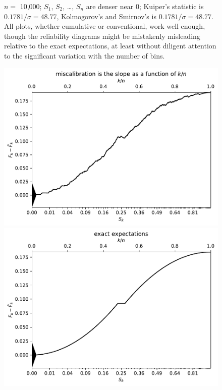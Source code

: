 \documentclass{article}
\begin{document}
\begin{figure}
\begin{centering}
\end{centering}
\caption{$n =$ 10,000; $S_1$, $S_2$, \dots, $S_n$ are denser near 0;
         Kuiper's statistic is $0.1781 / \sigma = 48.77$,
         Kolmogorov's and Smirnov's is $0.1781 / \sigma = 48.77$.
All plots, whether cumulative or conventional, work well enough,
though the reliability diagrams
might be mistakenly misleading relative to the exact expectations,
at least without diligent attention to the significant variation
with the number of bins.
}
\label{10000_0}
\end{figure}


\begin{figure}
\begin{centering}

\parbox{\imsize}{\includegraphics[width=\imsize]
                {./codes/unweighted/1000_10_1_2/cumulative.pdf}}
\quad\quad
\parbox{\imsize}{\includegraphics[width=\imsize]
                {./codes/unweighted/1000_10_1_2/cumulative_exact.pdf}}


\end{centering}
\end{figure}
\end{document}
